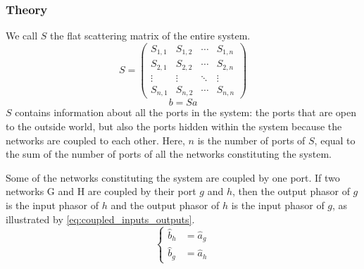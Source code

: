 \subsubsection{Theory}

We call $S$ the flat scattering matrix of the entire system.
\begin{equation*}
    S =
    \begin{pmatrix}
        S_{1, 1} & S_{1, 2} & \cdots & S_{1, n} \\
        S_{2, 1} & S_{2, 2} & \cdots & S_{2, n} \\
        \vdots   & \vdots   & \ddots & \vdots \\
        S_{n, 1} & S_{n, 2} & \cdots & S_{n, n}
    \end{pmatrix}
\end{equation*}
\begin{equation*}
    b = Sa
\end{equation*}
$S$ contains information about all the ports in the system: the ports that are open to the outside world, but also the ports hidden within the system because the networks are coupled to each other.
Here, $n$ is the number of ports of $S$, equal to the sum of the number of ports of all the networks constituting the system.

Some of the networks constituting the system are coupled by one port.
If two networks G and H are coupled by their port $g$ and $h$, then the output phasor of $g$ is the input phasor of $h$ and the output phasor of $h$ is the input phasor of $g$, as illustrated by \cref{eq:coupled_inputs_outputs}.
\begin{equation}
    \left\lbrace
    \begin{aligned}
        \hat{b}_h &= \hat{a}_g \\
        \hat{b}_g &= \hat{a}_h
    \end{aligned}
    \right.
    \label{eq:coupled_inputs_outputs}
\end{equation}

